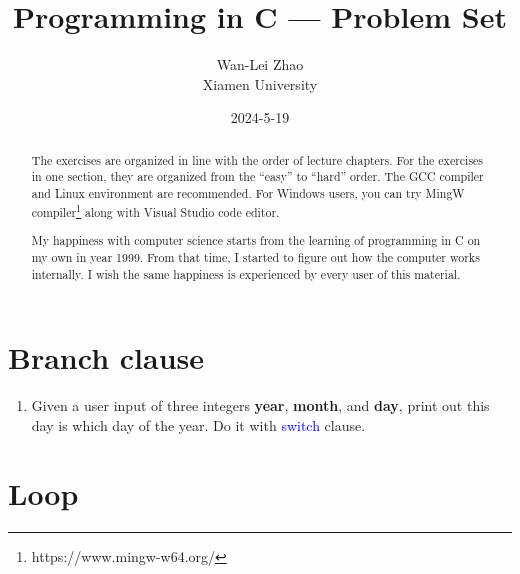 \documentclass[11pt]{article}
\title{Programming in C --- Problem Set}
\author{Wan-Lei Zhao\\Xiamen University}
\date{2024-5-19}
\begin{document}
\maketitle
\begin{abstract}
The exercises are organized in line with the order of lecture chapters. For the exercises in one section, they are organized from the ``easy'' to ``hard'' order. The GCC compiler and Linux environment are recommended. For Windows users, you can try MingW compiler\footnote{https://www.mingw-w64.org/} along with Visual Studio code editor.

My happiness with computer science starts from the learning of programming in C on my own in year 1999. From that time, I started to figure out how the computer works internally. I wish the same happiness is experienced by every user of this material.

\end{abstract}

\tableofcontents
\newpage
\section{Branch clause}

\begin{enumerate}
    \item Given a user input of three integers \textbf{year}, \textbf{month}, and \textbf{day}, print out this day is which day of the year. Do it with \textcolor{blue}{switch} clause.
\end{enumerate}

\section{Loop}
\end{document}
